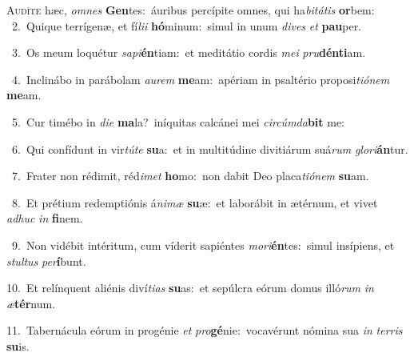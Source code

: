 \lettrine{\initial\textcolor{\initialcolor}{A}}{udíte} hæc, \textit{om}\-\textit{nes} \textbf{Gen}\-tes:~\star áuribus percípite omnes, qui ha\-\textit{bi}\-\textit{tá}\textit{tis} \textbf{or}\-bem:\\
{\numbfont\textcolor{\numbcolor}{~2.}}~Quique terrígenæ, et fí\-\textit{li}\-\textit{i} \textbf{hó}\-minum:~\star simul in unum \textit{di}\-\textit{ves} \textit{et} \textbf{pau}\-per.\par
{\numbfont\textcolor{\numbcolor}{~3.}}~Os meum loquétur \textit{sa}\-\textit{pi}\textbf{én}tiam:~\star et meditátio cordis \textit{me}\-\textit{i} \textit{pru}\-\textbf{dén}\textbf{ti}am.\par
{\numbfont\textcolor{\numbcolor}{~4.}}~Inclinábo in parábolam \textit{au}\-\textit{rem} \textbf{me}\-am:~\star apériam in psaltério proposi\-\textit{ti}\-\textit{ó}\textit{nem} \textbf{me}\-am.\par
{\numbfont\textcolor{\numbcolor}{~5.}}~Cur timébo in \textit{di}\-\textit{e} \textbf{ma}\-la?~\star iníquitas calcánei mei \textit{cir}\-\textit{cúm}\textit{da}\textbf{bit} me:\par
{\numbfont\textcolor{\numbcolor}{~6.}}~Qui confídunt in vir\-\textit{tú}\-\textit{te} \textbf{su}\-a:~\star et in multitúdine divitiárum suá\textit{rum} \textit{glo}\-\textit{ri}\textbf{án}tur.\par
{\numbfont\textcolor{\numbcolor}{~7.}}~Frater non rédimit, réd\-\textit{i}\-\textit{met} \textbf{ho}\-mo:~\star non dabit Deo placa\-\textit{ti}\-\textit{ó}\textit{nem} \textbf{su}\-am.\par
{\numbfont\textcolor{\numbcolor}{~8.}}~Et prétium redemptiónis á\-\textit{ni}\-\textit{mæ} \textbf{su}\-æ:~\star et laborábit in ætérnum, et vivet \textit{ad}\-\textit{huc} \textit{in} \textbf{fi}\-nem.\par
{\numbfont\textcolor{\numbcolor}{~9.}}~Non vidébit intéritum, cum víderit sapiéntes \textit{mo}\-\textit{ri}\textbf{én}tes:~\star simul insípiens, et \textit{stul}\-\textit{tus} \textit{per}\-\textbf{í}bunt.\par
{\numbfont\textcolor{\numbcolor}{10.}}~Et relínquent aliénis diví\-\textit{ti}\-\textit{as} \textbf{su}\-as:~\star et sepúlcra eórum domus illó\textit{rum} \textit{in} \textit{æ}\-\textbf{tér}num.\par
{\numbfont\textcolor{\numbcolor}{11.}}~Tabernácula eórum in progénie \textit{et} \textit{pro}\-\textbf{gé}nie:~\star vocavérunt nómina sua \textit{in} \textit{ter}\-\textit{ris} \textbf{su}\-is.\par
